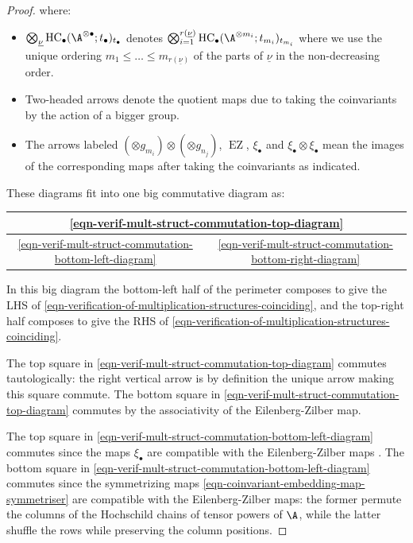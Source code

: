 \documentclass[12pt,a4paper,reqno]{amsart}
\DeclareMathOperator{\hochcx}{{HC}}
\DeclareMathOperator\ezmap{{EZ}}
\begin{document}
\begin{proof}
where:
\begin{itemize}
\item $\bigotimes_{\underline{\nu}}
\hochcx_\bullet(\A^{\otimes\bullet};t_{\bullet})_{t_{\bullet}}$ 
denotes $\bigotimes_{i=1}^{r(\underline{\nu})} 
\hochcx_\bullet(\A^{\otimes m_i};t_{m_i})_{t_{m_i}}$ 
where we use the unique ordering 
$m_1 \leq \dots \leq m_{r(\underline{\nu})}$ 
of the parts of $\underline{\nu}$ in the non-decreasing order. 
\item Two-headed arrows denote the quotient maps due to taking
the coinvariants by the action of a bigger group.
\item The arrows labeled $(\otimes g_{m_i}) \otimes (\otimes g_{n_j})$, 
$\ezmap$, $\xi_\bullet$ and $\xi_\bullet \otimes \xi_\bullet$
mean the images of the corresponding maps after taking 
the coinvariants as indicated. 
\end{itemize}

These diagrams fit into one big commutative diagram as:
\begin{center}
\begin{tabular}{|c|c|}
\hline
\multicolumn{2}{|c|}{\eqref{eqn-verif-mult-struct-commutation-top-diagram}}
\\
\hline
\eqref{eqn-verif-mult-struct-commutation-bottom-left-diagram}
&
\eqref{eqn-verif-mult-struct-commutation-bottom-right-diagram}
\\
\hline
\end{tabular}
\end{center}
In this big diagram the bottom-left half of the perimeter composes
to give the LHS of 
\eqref{eqn-verification-of-multiplication-structures-coinciding}, 
and the top-right half composes to give the RHS of
\eqref{eqn-verification-of-multiplication-structures-coinciding}.

The top square in \eqref{eqn-verif-mult-struct-commutation-top-diagram} 
commutes tautologically: the right vertical
arrow is by definition the unique arrow making this
square commute. The bottom square in 
\eqref{eqn-verif-mult-struct-commutation-top-diagram}
commutes by the associativity of the Eilenberg-Zilber map.   

The top square in
\eqref{eqn-verif-mult-struct-commutation-bottom-left-diagram}
commutes since the maps $\xi_\bullet$ are compatible with 
the Eilenberg-Zilber maps
\cite[Lemma
5.17]{GyengeLogvinenko-TheHeisenbergAlgebraOfAVectorSpaceAndHochschildHomology}.
The bottom square in 
\eqref{eqn-verif-mult-struct-commutation-bottom-left-diagram}
commutes since the symmetrizing maps
\eqref{eqn-coinvariant-embedding-map-symmetriser} are compatible
with the Eilenberg-Zilber maps: the former permute the columns
of the Hochschild chains of tensor powers of $\A$, while the latter
shuffle the rows while preserving the column positions. 


\end{proof}
\end{document}
